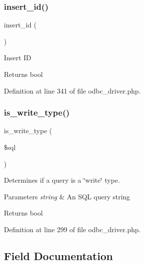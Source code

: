 \mbox{\label{class_c_i___d_b__odbc__driver_a933f2cde8dc7f87875e257d0a4902e99}} 
\subsubsection{\texorpdfstring{insert\_id()}{insert\_id()}}
{\footnotesize\ttfamily insert\+\_\+id (\begin{DoxyParamCaption}{ }\end{DoxyParamCaption})}

Insert ID

\begin{DoxyReturn}{Returns}
bool 
\end{DoxyReturn}


Definition at line 341 of file odbc\+\_\+driver.\+php.

\mbox{\label{class_c_i___d_b__odbc__driver_af435df5703c238769d6d16fde6d51182}} 
\subsubsection{\texorpdfstring{is\_write\_type()}{is\_write\_type()}}
{\footnotesize\ttfamily is\+\_\+write\+\_\+type (\begin{DoxyParamCaption}\item[{}]{\$sql }\end{DoxyParamCaption})}

Determines if a query is a \char`\"{}write\char`\"{} type.


\begin{DoxyParams}{Parameters}
{\em string} & An S\+QL query string \\
\hline
\end{DoxyParams}
\begin{DoxyReturn}{Returns}
bool 
\end{DoxyReturn}


Definition at line 299 of file odbc\+\_\+driver.\+php.



\subsection{Field Documentation}
\mbox{\label{class_c_i___d_b__odbc__driver_aaec2fb0112850159063a8e47ad3aed6e}} 
